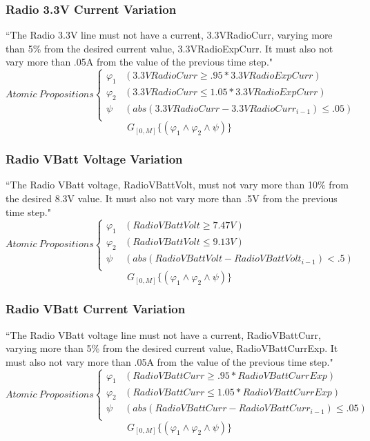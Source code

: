 \documentclass[conf]{new-aiaa}
\begin{document}
\subsubsection{\textbf{Radio 3.3V Current Variation}}
“The Radio 3.3V line must not have a current, 3.3VRadioCurr, varying more than 5\% from
the desired current value, 3.3VRadioExpCurr. It must also not vary more than .05A from the value of the previous time step."
\[ Atomic\:Propositions \begin{cases}
  \varphi_1 & (3.3VRadioCurr \geq .95*3.3VRadioExpCurr) \\
  \varphi_2 & (3.3VRadioCurr \leq 1.05*3.3VRadioExpCurr) \\
  \psi & (abs(3.3VRadioCurr - 3.3VRadioCurr_{i-1}) \leq .05)\\
\end{cases} \]
\begin{equation}
    \label{Spec 8}
    G_{[0,M]} \{(\varphi_1 \wedge \varphi_2 \wedge \psi)\}
\end{equation} 

\subsubsection{\textbf{Radio VBatt Voltage Variation}}
“The Radio VBatt voltage, RadioVBattVolt, must not vary more than 10\% from the desired 8.3V value. It must also not vary more than .5V from the previous time step."
\[ Atomic\:Propositions \begin{cases}
  \varphi_1 & (RadioVBattVolt \geq 7.47V) \\
  \varphi_2 & (RadioVBattVolt \leq 9.13V) \\
  \psi & (abs(RadioVBattVolt - RadioVBattVolt_{i-1}) < .5)\\
\end{cases} \]
\begin{equation}
    \label{Spec 9}
    G_{[0,M]} \{(\varphi_1 \wedge \varphi_2 \wedge \psi)\}
\end{equation} 

\subsubsection{\textbf{Radio VBatt Current Variation}}
“The Radio VBatt voltage line must not have a current, RadioVBattCurr, varying more than 5\% from the desired current value, RadioVBattCurrExp. It must also not vary more than .05A from the value of the previous time step."
\[ Atomic\:Propositions \begin{cases}
  \varphi_1 & (RadioVBattCurr \geq .95*RadioVBattCurrExp) \\
  \varphi_2 & (RadioVBattCurr \leq 1.05*RadioVBattCurrExp) \\
  \psi & (abs(RadioVBattCurr - RadioVBattCurr_{i-1}) \leq .05)\\
\end{cases} \]
\begin{equation}
    \label{Spec 10}
    G_{[0,M]} \{(\varphi_1 \wedge \varphi_2 \wedge \psi)\}
\end{equation} 
\end{document}
